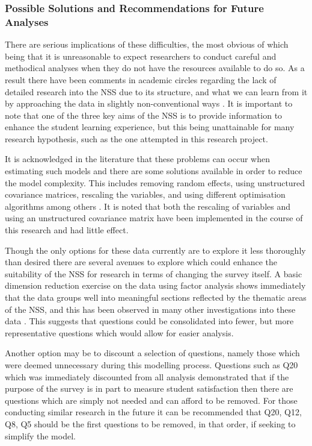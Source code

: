\documentclass[11pt,a4paper]{report}
\begin{document}
\subsubsection{Possible Solutions and Recommendations for Future Analyses}
There are serious implications of these difficulties, the most obvious of which being that it is unreasonable to expect researchers to conduct careful and methodical analyses when they do not have the resources available to do so. As a result there have been comments in academic circles regarding the lack of detailed research into the NSS due to its structure, and what we can learn from it by approaching the data in slightly non-conventional ways \cite{canning2015new}. It is important to note that one of the three key aims of the NSS is to provide information to enhance the student learning experience, but this being unattainable for many research hypothesis, such as the one attempted in this research project. 

It is acknowledged in the literature that these problems can occur when estimating such models and there are some solutions available in order to reduce the model complexity. This includes removing random effects, using unstructured covariance matrices, rescaling the variables, and using different optimisation algorithms among others \cite{LinearMMs}. It is noted that both the rescaling of variables and using an unstructured covariance matrix have been implemented in the course of this research and had little effect. 

Though the only options for these data currently are to explore it less thoroughly than desired there are several avenues to explore which could enhance the suitability of the NSS for research in terms of changing the survey itself. A basic dimension reduction exercise on the data using factor analysis shows immediately that the data groups well into meaningful sections reflected by the thematic areas of the NSS, and this has been observed in many other investigations into these data \cite{cheng2010unicoursediffs, ramsden2010enhancing, marshandcheng2008} . This suggests that questions could be consolidated into fewer, but more representative questions which would allow for easier analysis.

Another option may be to discount a selection of questions, namely those which were deemed unnecessary during this modelling process. Questions such as Q20 which was immediately discounted from all analysis demonstrated that if the purpose of the survey is in part to measure student satisfaction then there are questions which are simply not needed and can afford to be removed. For those conducting similar research in the future it can be recommended that Q20, Q12, Q8, Q5 should be the first questions to be removed, in that order, if seeking to simplify the model. 
\end{document}
